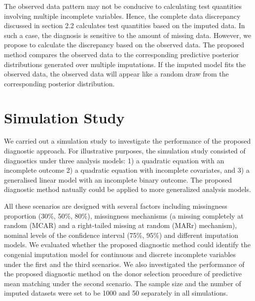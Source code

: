 \documentclass[12pt, fullpage, a4paper]{article}
\begin{document}
The observed data pattern may not be conducive to calculating test quantities involving multiple incomplete variables. Hence, the complete data discrepancy discussed in section 2.2 calculates test quantities based on the imputed data. In such a case, the diagnosis is sensitive to the amount of missing data. However, we propose to calculate the discrepancy based on the observed data. The proposed method compares the observed data to the corresponding predictive posterior distributions generated over multiple imputations. If the imputed model fits the observed data, the observed data will appear like a random draw from the corresponding posterior distribution.             


\section{Simulation Study}
We carried out a simulation study to investigate the performance of the proposed diagnostic approach. For illustrative purposes, the simulation study consisted of diagnostics under three analysis models: 1) a quadratic equation with an incomplete outcome 2) a quadratic equation with incomplete covariates, and 3) a generalised linear model with an incomplete binary outcome. The proposed diagnostic method natually could be applied to more generalized analysis models. 

All these scenarios are designed with several factors including missingness proportion (30\%, 50\%, 80\%), missingness mechanisms (a missing completely at random (MCAR) and a right-tailed missing at random (MARr) mechanism), nominal levels of the confidence interval (75\%, 95\%) and different imputation models. We evaluated whether the proposed diagnostic method could identify the congenial imputation model for continuous and discrete incomplete variables under the first and the third scenarios. We also investigated the performance of the proposed diagnostic method on the donor selection procedure of predictive mean matching under the second scenario. The sample size and the number of imputed datasets were set to be 1000 and 50 separately in all simulations.
\end{document}
